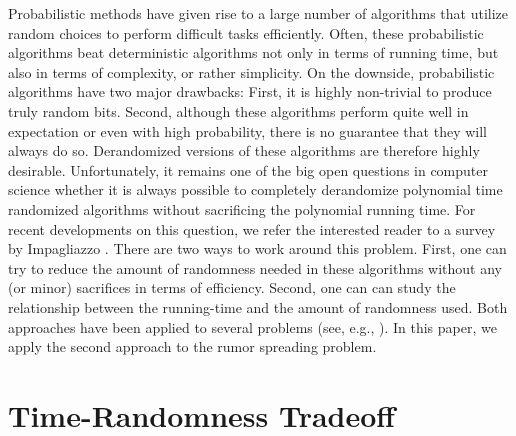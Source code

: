 \documentclass{article}
\begin{document}
Probabilistic methods have given rise to a large number of algorithms that utilize random choices to perform difficult tasks efficiently. Often, these probabilistic algorithms beat deterministic algorithms not only in terms of running time, but also in terms of complexity, or rather simplicity. On the downside, probabilistic algorithms have two major drawbacks: First, it is highly non-trivial to produce truly random bits. Second, although these algorithms perform quite well in expectation or even with high probability, there is no guarantee that they will always do so. Derandomized versions of these algorithms are therefore highly desirable. Unfortunately, it remains one of the big open questions in computer science whether it is always possible to completely derandomize polynomial time randomized algorithms without sacrificing the polynomial running time. For recent developments on this question, we refer the interested reader to a survey by Impagliazzo \cite{I07}. There are two ways to work around this problem. First, one can try to reduce the amount of randomness needed in these algorithms without any (or minor) sacrifices in terms of efficiency. Second, one can can study the relationship between the running-time and the amount of randomness used. Both approaches have been applied to several problems (see, e.g., \cite{B91,CG89,KR88,PU90,BC}). In this paper, we apply the second approach to the rumor spreading problem.  


\section{Time-Randomness Tradeoff}
\end{document}

